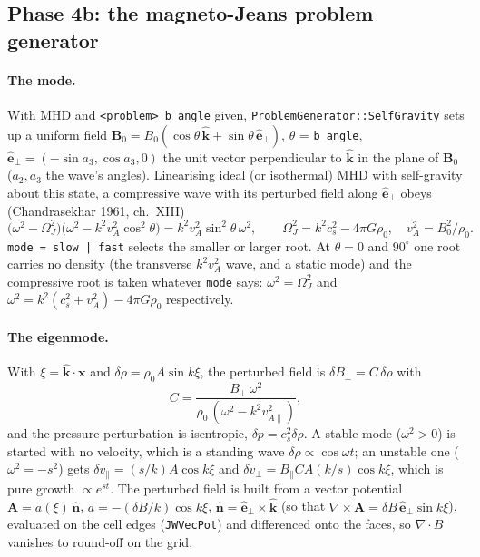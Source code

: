 \documentclass[11pt]{article}
\newcommand{\code}[1]{\texttt{#1}}
\newcommand{\fn}[1]{\texttt{\small #1}}
\begin{document}
\subsection{Phase 4b: the magneto-Jeans problem generator}
\label{sec:phase4b}

\paragraph{The mode.} With MHD and \code{<problem> b\_angle} given,
\fn{ProblemGenerator::SelfGravity} sets up a uniform field
$\mathbf{B}_0 = B_0(\cos\theta\,\hat{\mathbf k} + \sin\theta\,\hat{\mathbf e}_\perp)$,
$\theta$ = \code{b\_angle}, $\hat{\mathbf e}_\perp = (-\sin a_3, \cos a_3, 0)$ the unit
vector perpendicular to $\hat{\mathbf k}$ in the plane of $\mathbf B_0$ ($a_2, a_3$ the
wave's angles). Linearising ideal (or isothermal) MHD with self-gravity about this state,
a compressive wave with its perturbed field along $\hat{\mathbf e}_\perp$ obeys
(Chandrasekhar 1961, ch.~XIII)
\begin{equation}
  \bigl(\omega^2 - \Omega_J^2\bigr)\bigl(\omega^2 - k^2 v_A^2\cos^2\theta\bigr)
  = k^2 v_A^2 \sin^2\theta\,\omega^2,
  \qquad \Omega_J^2 = k^2 c_s^2 - 4\pi G\rho_0,\quad v_A^2 = B_0^2/\rho_0 .
  \label{eq:mjdisp}
\end{equation}
\code{mode = slow | fast} selects the smaller or larger root. At $\theta = 0$ and $90^\circ$
one root carries no density (the transverse $k^2v_A^2$ wave, and a static mode) and the
compressive root is taken whatever \code{mode} says: $\omega^2 = \Omega_J^2$ and
$\omega^2 = k^2(c_s^2 + v_A^2) - 4\pi G\rho_0$ respectively.

\paragraph{The eigenmode.} With $\xi = \hat{\mathbf k}\cdot\mathbf x$ and $\delta\rho =
\rho_0 A\sin k\xi$, the perturbed field is $\delta B_\perp = C\,\delta\rho$ with
\begin{equation}
  C = \frac{B_\perp\,\omega^2}{\rho_0\,(\omega^2 - k^2 v_{A\parallel}^2)},
\end{equation}
and the pressure perturbation is isentropic, $\delta p = c_s^2\delta\rho$. A stable mode
($\omega^2 > 0$) is started with no velocity, which is a standing wave
$\delta\rho \propto \cos\omega t$; an unstable one ($\omega^2 = -s^2$) gets
$\delta v_\parallel = (s/k)A\cos k\xi$ and $\delta v_\perp = B_\parallel C A (k/s)\cos k\xi$,
which is pure growth $\propto e^{st}$. The perturbed field is built from a vector potential
$\mathbf A = a(\xi)\,\hat{\mathbf n}$, $a = -(\delta B/k)\cos k\xi$,
$\hat{\mathbf n} = \hat{\mathbf e}_\perp\times\hat{\mathbf k}$ (so that
$\nabla\times\mathbf A = \delta B\,\hat{\mathbf e}_\perp\sin k\xi$), evaluated on the cell
edges (\fn{JWVecPot}) and differenced onto the faces, so $\nabla\!\cdot\!B$ vanishes to
round-off on the grid.
\end{document}
